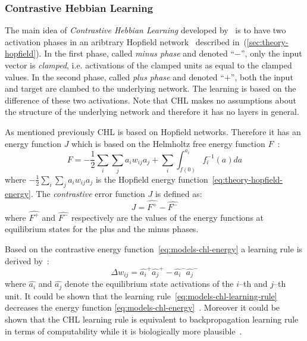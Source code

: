 
\subsubsection{Contrastive Hebbian Learning}
\label{sec:models-chl} 

The main idea of \emph{Contrastive Hebbian Learning} developed by~\citet{movellan1990contrastive} is to have two activation phases in an aribtrary Hopfield network~\citep{hopfield1984neurons} described in~(\ref{sec:theory-hopfield}). In the first phase, called \emph{minus phase} and denoted ``$-$'', only the input vector is \emph{clamped}, i.e. activations of the clamped units as equal to the clamped values. In the second phase, called \emph{plus phase} and denoted ``$+$'', both the input and target are clambed to the underlying network. The learning is based on the difference of these two activations. Note that CHL makes no assumptions about the structure of the underlying network and therefore it has no layers in general. 

As mentioned previously CHL is based on Hopfield networks. Therefore it has an energy function $J$ which is based on the Helmholtz free energy function $F$~\citep{hinton1989deterministic}:
\begin{equation}
  \label{eq:models-chl-helmholtz}
  F = -\frac{1}{2}\sum_i\sum_ja_iw_{ij}a_j + \sum_i \int_{f(0)}^{a_i} f_i^{-1}(a)da
\end{equation} 
where $-\frac{1}{2}\sum_i\sum_ja_iw_{ij}a_j$ is the Hopfield energy function~\ref{eq:theory-hopfield-energy}. The \emph{contrastive} error function $J$ is defined as: 
\begin{equation}
  \label{eq:models-chl-energy}
  J = \hat{F^{+}} - \hat{F^{-}}
\end{equation} 
where $\hat{F^{+}}$ and $\hat{F^{-}}$ respectively are the values of the energy functions at equilibrium states for the plus and the minus phases. 

Based on the contrastive energy function~\ref{eq:models-chl-energy} a learning rule is derived by~\citet{movellan1990contrastive}: 
\begin{equation}
  \label{eq:models-chl-learning-rule}
  \Delta w_{ij} = \hat{a_i}^{+}\hat{a_j}^{+} - \hat{a_i}^{-}\hat{a_j}^{-}
\end{equation}
where $\hat{a_i}$ and $\hat{a_j}$ denote the equilibrium state activations of the $i$--th and $j$--th unit. It could be shown that the learning rule~\ref{eq:models-chl-learning-rule} decreases the energy function \ref{eq:models-chl-energy}~\citep{movellan1990contrastive}. Moreover it could be shown that the CHL learning rule is equivalent to backpropagation learning rule in terms of computability while it is biologically more plausible~\citep{o1996bio, xie2003equivalence}. 

   

